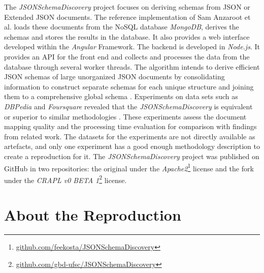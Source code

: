 \documentclass[sigconf, nonacm]{acmart}
\begin{document}
The \textit{JSONSchemaDiscovery} project focuses on deriving schemas from JSON or Extended JSON documents. The reference implementation of Sam Anzaroot et al. \cite{JSONSchemaDiscovery2013} loads these documents from the NoSQL database \textit{MongoDB}, derives the schemas and stores the results in the database. It also provides a web interface developed within the \textit{Angular} Framework. The backend is developed in \textit{Node.js}. It provides an API for the front end and collects and processes the data from the database through several worker threads. The algorithm intends to derive efficient JSON schemas of large unorganized JSON documents by consolidating information to construct separate schemas for each unique structure and joining them to a comprehensive global schema \cite{8424731}. Experiments on data sets such as \textit{DBPedia} and \textit{Foursquare} revealed that the \textit{JSONSchemaDiscovery} is equivalent or superior to similar methodologies \cite{8424731}. These experiments assess the document mapping quality and the processing time evaluation for comparison with findings from related work. The datasets for the experiments are not directly available as artefacts, and only one experiment has a good enough methodology description to create a reproduction for it. The \textit{JSONSchemaDiscovery} project was published on GitHub in two repositories: the original under the \textit{Apache2}\footnote{\url{github.com/feekosta/JSONSchemaDiscovery}} license and the fork under the \textit{CRAPL v0 BETA 1}\footnote{\url{github.com/gbd-ufsc/JSONSchemaDiscovery}} license.

\section{About the Reproduction}
\end{document}
